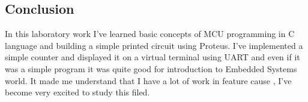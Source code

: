 \subsection*{Conclusion}
In this laboratory work I've learned basic concepts of MCU
programming in C language and building a simple printed circuit using Proteus. I've implemented a simple counter and displayed it on a virtual terminal using UART and even if it was a simple program it was quite good for introduction to Embedded Systems world. It made me understand that I have a lot of work in feature cause , I've become very excited to study this filed.




